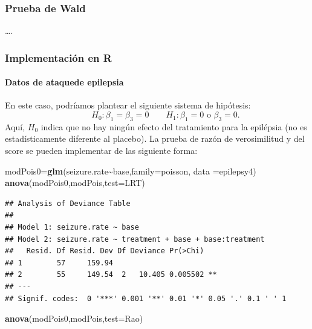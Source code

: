 \documentclass[
]{article}
\newenvironment{Shaded}{\begin{snugshade}}{\end{snugshade}}
\newcommand{\AttributeTok}[1]{\textcolor[rgb]{0.13,0.29,0.53}{#1}}
\newcommand{\FunctionTok}[1]{\textcolor[rgb]{0.13,0.29,0.53}{\textbf{#1}}}
\newcommand{\NormalTok}[1]{#1}
\newcommand{\OtherTok}[1]{\textcolor[rgb]{0.56,0.35,0.01}{#1}}
\newcommand{\SpecialCharTok}[1]{\textcolor[rgb]{0.81,0.36,0.00}{\textbf{#1}}}
\newcommand{\StringTok}[1]{\textcolor[rgb]{0.31,0.60,0.02}{#1}}
\begin{document}
\subsubsection{Prueba de Wald}\label{prueba-de-wald}

\ldots.

\subsubsection{Implementación en R}\label{implementaciuxf3n-en-r-6}

\paragraph{Datos de ataquede epilepsia}\label{datos-de-ataquede-epilepsia}

En este caso, podríamos plantear el siguiente sistema de hipótesis:
\[
\qquad H_0:\beta_1=\beta_3=0 \qquad H_1: \beta_1=0 \mbox{ o } \beta_3=0.
\]
Aquí, \(H_0\) indica que no hay ningún efecto del tratamiento para la epilépsia (no es estadísticamente diferente al placebo). La prueba de razón de verosimilitud y del score se pueden implementar de las siguiente forma:

\begin{Shaded}
\begin{Highlighting}[]
\NormalTok{modPois0}\OtherTok{=}\FunctionTok{glm}\NormalTok{(seizure.rate}\SpecialCharTok{\textasciitilde{}}\NormalTok{base,}\AttributeTok{family=}\NormalTok{poisson,}
            \AttributeTok{data =}\NormalTok{epilepsy4)}
\FunctionTok{anova}\NormalTok{(modPois0,modPois,}\AttributeTok{test=}\StringTok{\textquotesingle{}LRT\textquotesingle{}}\NormalTok{)}
\end{Highlighting}
\end{Shaded}

\begin{verbatim}
## Analysis of Deviance Table
## 
## Model 1: seizure.rate ~ base
## Model 2: seizure.rate ~ treatment + base + base:treatment
##   Resid. Df Resid. Dev Df Deviance Pr(>Chi)   
## 1        57     159.94                        
## 2        55     149.54  2   10.405 0.005502 **
## ---
## Signif. codes:  0 '***' 0.001 '**' 0.01 '*' 0.05 '.' 0.1 ' ' 1
\end{verbatim}

\begin{Shaded}
\begin{Highlighting}[]
\FunctionTok{anova}\NormalTok{(modPois0,modPois,}\AttributeTok{test=}\StringTok{\textquotesingle{}Rao\textquotesingle{}}\NormalTok{)}
\end{Highlighting}
\end{Shaded}
\end{document}
